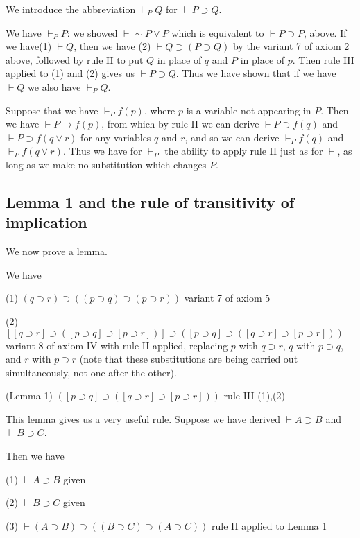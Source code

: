 \documentclass[12pt]{article}
\begin{document}
We introduce the abbreviation $\vdash_P Q$ for $\vdash P \supset Q$.

We have $\vdash_P P$:  we showed $\vdash \sim P \vee P$ which is equivalent to $\vdash P \supset P$, above.
If we have(1)  $\vdash Q$, then we have (2) $\vdash Q \supset (P \supset Q)$ by the variant 7 of axiom 2 above, followed by rule II to put $Q$ in place of $q$ and $P$ in place of $p$.
Then rule III applied to (1) and (2) gives us $\vdash P \supset Q$.  Thus we have shown that if we have $\vdash Q$ we also have $\vdash_P Q$.

Suppose that we have $\vdash_P f(p)$, where $p$ is a variable not appearing in $P$.  Then we have $\vdash P \rightarrow f(p)$, from which by rule II we can derive $\vdash P \supset f(q)$ and $\vdash P\supset f(q \vee r)$ for any variables $q$ and $r$, and so we can derive $\vdash_P f(q)$ and $\vdash_P f(q \vee r)$.  Thus we have for $\vdash_P$ the ability to apply rule II just as for $\vdash$, as long as we make no substitution which changes $P$.

\subsection {Lemma 1 and the rule of transitivity of implication}

We now prove a lemma.

We have

(1) $( q \supset r) \supset ((p \supset q) \supset (p \supset r))$  variant 7 of axiom 5

(2)  $[[q \supset r] \supset ([p \supset q] \supset  [p \supset r])] \supset ([p \supset q] \supset  ([q \supset r] \supset [p \supset r]))$  variant 8 of axiom IV with rule II
applied, replacing $p$ with $q \supset r$, $q$ with $p \supset q$, and $r$ with $p \supset r$ (note that these substitutions are being carried out simultaneously, not one after the other).

(Lemma 1)  $([p \supset q] \supset  ([q \supset r] \supset [p \supset r]))$  rule III (1),(2)

This lemma gives us a very useful rule.  Suppose we have derived $\vdash A \supset B$ and $\vdash B \supset C$.

Then we have

(1) $\vdash A \supset B$  given

(2) $\vdash B \supset C$ given

(3) $\vdash (A \supset B) \supset ((B \supset C) \supset (A \supset C))$  rule II applied to Lemma 1
\end{document}
